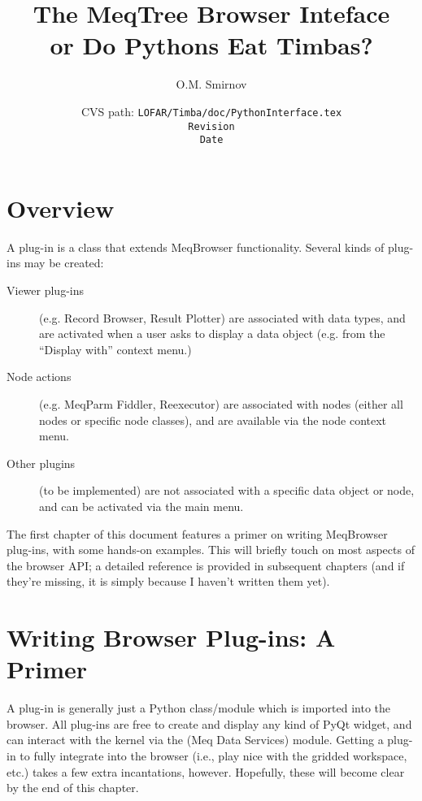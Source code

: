 \documentclass[12pt,twoside]{book}
\title{{\sf The MeqTree Browser Inteface\\\small or Do Pythons Eat Timbas?}}
\author{{\sf O.M. Smirnov}}
\date{\vspace{2cm}\small CVS path: \tt LOFAR/Timba/doc/PythonInterface.tex\\\rm
$ $Revision$ $\\$ $Date$ $}
\begin{document}
\sloppy

\maketitle

\chapter*{Overview}

  A plug-in is a class that extends MeqBrowser functionality. Several kinds
  of plug-ins may be created:

  \begin{description}
  
  \item[Viewer plug-ins] (e.g. Record Browser, Result Plotter) are associated
  with data types, and are activated when a user asks to display a data object
  (e.g. from the ``Display with'' context menu.)

  \item[Node actions] (e.g. MeqParm Fiddler, Reexecutor) are associated with
  nodes (either all nodes or specific node classes), and are available via the
  node context menu.

  \item[Other plugins] (to be implemented) are not associated with a specific
  data object or node, and can be activated via the main menu.

  \end{description}

  The first chapter of this document features a primer on writing MeqBrowser
  plug-ins, with some hands-on examples. This will briefly touch on most aspects
  of the browser API; a detailed reference is provided in subsequent chapters
  (and if they're missing, it is simply because I haven't written them yet). 
  
\chapter{Writing Browser Plug-ins: A Primer}
  
  A plug-in is generally just a Python class/module which is imported into the
  browser. All plug-ins are free to create and display any kind of PyQt widget,
  and can interact with the kernel via the  (Meq Data Services)
  module. Getting a plug-in to fully integrate into the browser (i.e.,  play
  nice with the gridded workspace, etc.) takes a few extra incantations,
  however. Hopefully, these will become clear by the end of this chapter.
\end{document}
